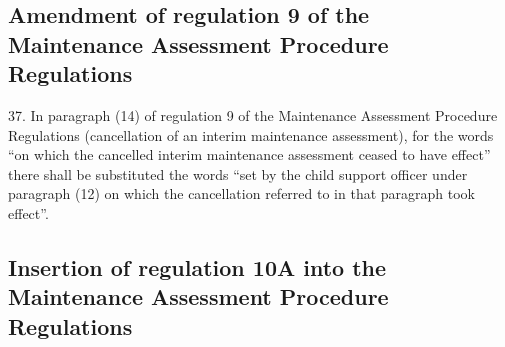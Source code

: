 \documentclass[12pt,a4paper]{article}
\begin{document}
\subsection[37. Amendment of regulation 9 of the Maintenance Assessment Procedure Regulations]{\sloppy Amendment of regulation 9 of the Maintenance Assessment Procedure Regulations}

37.  In paragraph (14) of regulation 9 of the Maintenance Assessment Procedure Regulations (cancellation of an interim maintenance assessment), for the words “on which the cancelled interim maintenance assessment ceased to have effect” there shall be substituted the words “set by the child support officer under paragraph (12) on which the cancellation referred to in that paragraph took effect”.

\subsection[38. Insertion of regulation 10A into the Maintenance Assessment Procedure Regulations]{Insertion of regulation 10A into the Maintenance Assessment Procedure Regulations}
\end{document}
